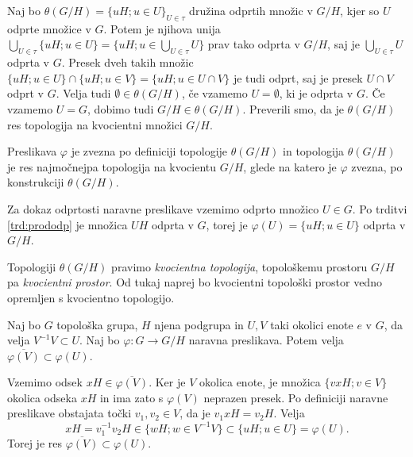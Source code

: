 \documentclass[mat1]{fmfdelo}
\newcommand{\closure}[1]{\overline{#1}}
\begin{document}
\begin{dokaz}
Naj bo $\theta(G/H) = \lbrace uH ; u \in U \rbrace_{U \in \tau}$ družina odprtih množic v $G/H$, kjer so $U$ odprte množice v $G$. Potem je njihova unija $\bigcup_{U \in \tau} \lbrace uH ; u \in U \rbrace = \lbrace uH ; u \in \bigcup_{U \in \tau}U \rbrace$ prav tako odprta v $G/H$, saj je $\bigcup_{U \in \tau}U$ odprta v $G$. Presek dveh takih množic $\lbrace uH ; u \in U \rbrace \cap \lbrace uH ; u \in V \rbrace = \lbrace uH ; u \in U \cap V \rbrace$ je tudi odprt, saj je presek $U \cap V$ odprt v $G$. Velja tudi $\emptyset \in \theta(G/H)$, če vzamemo $U = \emptyset$, ki je odprta v $G$. Če vzamemo $U = G$, dobimo tudi $G/H \in \theta(G/H)$. Preverili smo, da je $\theta(G/H)$ res topologija na kvocientni množici $G/H$.

Preslikava $\varphi$ je zvezna po definiciji topologije $\theta(G/H)$ in topologija $\theta(G/H)$ je res najmočnejpa topologija na kvocientu $G/H$, glede na katero je $\varphi$ zvezna, po konstrukciji $\theta(G/H)$.

Za dokaz odprtosti naravne preslikave vzemimo odprto množico $U \in G$. Po trditvi \ref{trd:prododp} je množica $UH$ odprta v $G$, torej je $\varphi(U) = \lbrace uH ; u \in U \rbrace$ odprta v $G/H$.
\end{dokaz}

Topologiji $\theta(G/H)$ pravimo \emph{kvocientna topologija}, topološkemu prostoru $G/H$ pa \emph{kvocientni prostor}. Od tukaj naprej bo kvocientni topološki prostor vedno opremljen s kvocientno topologijo.


\begin{trditev}\label{trd:okolicevkvoc}
Naj bo $G$ topološka grupa, $H$ njena podgrupa in $U, V$ taki okolici enote $e$ v $G$, da velja $V^{-1}V \subset U$. Naj bo $\varphi: G \to G/H$ naravna preslikava. Potem velja $\closure{\varphi(V)} \subset \varphi(U)$.
\end{trditev}

\begin{dokaz}
Vzemimo odsek $xH \in \closure{\varphi(V)}$. Ker je $V$ okolica enote, je množica $\lbrace vxH ; v \in V \rbrace$ okolica odseka $xH$ in ima zato s $\varphi(V)$ neprazen presek. Po definiciji naravne preslikave obstajata točki $v_1, v_2 \in V$, da je $v_1xH = v_2H$. Velja \[xH = v_1^{-1}v_2H \in \lbrace wH ; w \in V^{-1}V \rbrace \subset \lbrace uH ; u \in U \rbrace = \varphi(U). \]
Torej je res $\closure{\varphi(V)} \subset \varphi(U)$.
\end{dokaz}
\end{document}
